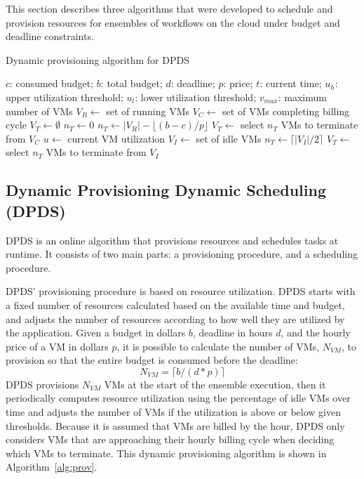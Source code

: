 \documentclass[preprint,5p]{elsarticle}
\begin{document}
This section describes three algorithms that were developed to schedule and
provision resources for ensembles of workflows on the cloud under budget and
deadline constraints.

\begin{algorithm}[tb]
\caption{Dynamic provisioning algorithm for DPDS}
\label{alg:prov}
{\footnotesize
\begin{algorithmic}[1]
\Require $c$: consumed budget; $b$: total budget; $d$: deadline; $p$: price;
$t$: current time; $u_h$: upper utilization threshold; $u_l$: lower utilization
threshold; $v_{max}$: maximum number of VMs
  \State $V_R\gets$ set of running VMs
    \State $V_C\gets$ set of VMs completing billing cycle
    \State $V_T\gets \emptyset$ 
    \State $n_T\gets 0$ 
      \State $n_T\gets |V_R| - \lfloor(b-c)/p\rfloor$
      \State $V_T\gets$ select $n_T$ VMs to terminate from $V_C$
      \State {} \label{l:terminate1}
    \Else 
    \State $u\gets$ current VM utilization
        \State {}
        \State $V_I\gets$ set of idle VMs
        \State $n_T\gets \lceil|V_I|/2\rceil$ \label{l:nT2}
      \State $V_T\gets$ select $n_T$ VMs to terminate from $V_I$
        \State {} \label{l:terminate2}
      \EndIf 
    \EndIf
\EndProcedure
\end{algorithmic}}
\end{algorithm}

\subsection{Dynamic Provisioning Dynamic Scheduling (DPDS)}
\label{sec:dpds}

DPDS is an online algorithm that provisions resources and schedules tasks at
runtime. It consists of two main parts: a provisioning procedure, and a
scheduling procedure.

DPDS' provisioning procedure is based on resource utilization. DPDS starts with
a fixed number of resources calculated based on the available time and budget,
and adjusts the number of resources according to how well they are utilized by
the application.
Given a budget in dollars $b$, deadline in hours $d$, and the hourly price of a
VM in dollars $p$, it is possible to calculate the number of VMs, $N_{VM}$, to
provision so that the entire budget is consumed before the deadline:
%
\begin{equation}
\label{eq:static-plan}
N_{VM} = \lceil b / (d * p) \rceil
\end{equation}
%
DPDS provisions $N_{VM}$ VMs at the start of the ensemble execution, then it
periodically computes resource utilization using the percentage of idle VMs
over time and adjusts the number of VMs if the utilization is above or below
given thresholds. Because it is assumed that VMs are billed by the hour, DPDS
only considers VMs that are approaching their hourly billing cycle when
deciding which VMs to terminate. This dynamic provisioning algorithm is shown
in Algorithm~\ref{alg:prov}.
\end{document}
